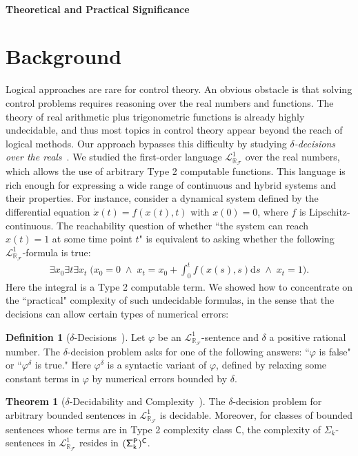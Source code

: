 \documentclass[10pt]{article}
\newcommand{\lrf}{\mathcal{L}_{\mathbb{R}_{\mathcal{F}}}}
\theoremstyle{definition}
\newtheorem{definition}{Definition}
\newtheorem{theorem}{Theorem}
\begin{document}
\paragraph{Theoretical and Practical Significance}


\section{Background}

Logical approaches are rare for control theory. An obvious obstacle is that solving control problems requires reasoning over the real numbers and functions. The theory of real arithmetic plus trigonometric functions is already highly undecidable, and thus most topics in control theory appear beyond the reach of logical methods. Our approach bypasses this difficulty by studying {\em $\delta$-decisions over the reals}~\cite{DBLP:conf/lics/GaoAC12}. We studied the first-order language $\lrf^1$ over the real numbers, which allows the use of arbitrary Type 2 computable functions. This language is rich enough for expressing a wide range of continuous and hybrid systems and their properties. For instance, consider a dynamical system defined by the differential equation $\dot{x}(t) = f(x(t),t)$ with $x(0)= 0$, where $f$ is Lipschitz-continuous. The reachability question of whether ``the system can reach $x(t)=1$ at some time point $t$" is equivalent to asking whether the following $\mathcal{L}^1_{\mathbb{R}_{\mathcal{F}}}$-formula is true:
\begin{eqnarray*}\exists x_0 \exists t \exists x_t\; \bigg(x_0 = 0 \;\wedge\; x_t = x_0 + \int_{0}^t f(x(s),s)\mathrm{d}s\; \wedge\; x_t = 1\bigg).\end{eqnarray*}
Here the integral is a Type 2 computable term. We showed how to concentrate on the ``practical" complexity of such undecidable formulas, in the sense that the decisions can allow certain types of numerical errors:
\begin{definition}[$\delta$-Decisions~\cite{DBLP:conf/lics/GaoAC12}] Let $\varphi$ be an $\lrf^1$-sentence and $\delta$ a positive rational number. The $\delta$-decision problem asks for one of the following answers: ``$\varphi$ is false" or ``$\varphi^{\delta}$ is true." Here $\varphi^{\delta}$ is a syntactic variant of $\varphi$, defined by relaxing some constant terms in $\varphi$ by numerical errors bounded by $\delta$. 
\end{definition}
\begin{theorem}[$\delta$-Decidability and Complexity~\cite{DBLP:conf/lics/GaoAC12}] The $\delta$-decision problem for arbitrary bounded sentences in $\lrf^1$ is decidable. Moreover, for classes of bounded sentences whose terms are in Type 2 complexity class $\mathsf{C}$, the complexity of $\Sigma_k$-sentences in $\lrf^1$ resides in ${\sf (\Sigma^P_k)^C}$. 
\end{theorem}
\end{document}
